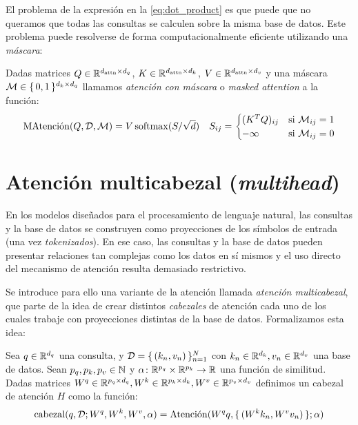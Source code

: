 El problema de la expresión en la \cref{eq:dot_product} es que puede que no queramos que todas las consultas se calculen sobre la misma base de datos. Este problema puede resolverse de forma computacionalmente eficiente utilizando una \textit{máscara}:
\begin{definition}
    Dadas matrices \( Q \in \mathbb{R}^{d_\text{attn} \times d_q}\), \(K \in \mathbb{R}^{d_\text{attn} \times d_k}\), \(V \in \mathbb{R}^{d_\text{attn} \times d_v}\) y una máscara \( \mathcal{M} \in \{\,0, 1\,\}^{d_k \times d_q}\) llamamos \textit{atención con máscara} o \textit{masked attention} a la función:
    \begin{align*}
        \operatorname{MAtenci\acute{o}n}(Q, \mathcal{D}, \mathcal{M}) = V\operatorname{softmax}(S/\sqrt{d}) && S_{ij} = \begin{cases}
            (K^TQ)_{ij} & \text{si $\mathcal{M}_{ij} = 1$} \\
            -\infty & \text{si $\mathcal{M}_{ij} = 0$} 
        \end{cases}
    \end{align*}
\end{definition}


\section{Atención multicabezal (\textit{multihead})}
En los modelos diseñados para el procesamiento de lenguaje natural, las consultas y la base de datos se construyen como proyecciones de los símbolos de entrada (una vez \textit{tokenizados}). En ese caso, las consultas y la base de datos pueden presentar relaciones tan complejas como los datos en sí mismos y el uso directo del mecanismo de atención resulta demasiado restrictivo.

Se introduce para ello una variante de la atención llamada \textit{atención multicabezal}, que parte de la idea de crear distintos \textit{cabezales} de atención cada uno de los cuales trabaje con proyecciones distintas de la base de datos. Formalizamos esta idea:

\begin{definition}\label{eq:attention_head}
    Sea \( q \in \mathbb{R}^{d_q} \) una consulta, y \( \mathcal{D} = \{\,(k_n, v_n)\,\}_{n = 1}^N \) con \( k_n \in \mathbb{R}^{d_k}, v_n\in \mathbb{R}^{d_v} \) una base de datos. Sean \( p_q, p_k, p_v \in \mathbb{N} \) y \( \alpha \colon \mathbb{R}^{p_q} \times \mathbb{R}^{p_k} \to \mathbb{R} \) una función de similitud. Dadas matrices \( W^q \in \mathbb{R}^{p_q \times d_q}, W^k \in \mathbb{R}^{p_k \times d_k}, W^v \in \mathbb{R}^{p_v \times d_v} \) definimos un cabezal de atención \( H \) como la función:
    \begin{equation} \label{eq:head}
        \operatorname{cabezal}(q, \mathcal{D}; W^q, W^k, W^v, \alpha)  = \operatorname{Atenci\acute{o}n}(W^q q, \{\,(W^k k_n,  W^v v_n)\,\}; \alpha)
    \end{equation}
\end{definition}

